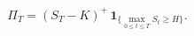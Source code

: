 \documentclass{equation-sheet}
\begin{document}
\begin{equation*}
\Pi_T=(S_T-K)^{+}\,
\mathbf{1}_{\{\max_{0\leq t\leq T}S_t\geq H\}}.
\end{equation*}
\end{document}
